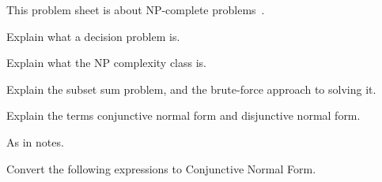 

\noindent
This problem sheet is about NP-complete problems~\cite{sipserbook}.

\begin{questions}

\question
Explain what a decision problem is.

\question
Explain what the NP complexity class is. 

\question
Explain the subset sum problem, and the brute-force approach to solving it.


\question
Explain the terms conjunctive normal form and disjunctive normal form.
\begin{solution}
As in notes.
\end{solution}


\question
Convert the following expressions to Conjunctive Normal Form.
\begin{solution}
\end{solution}
\end{questions}
